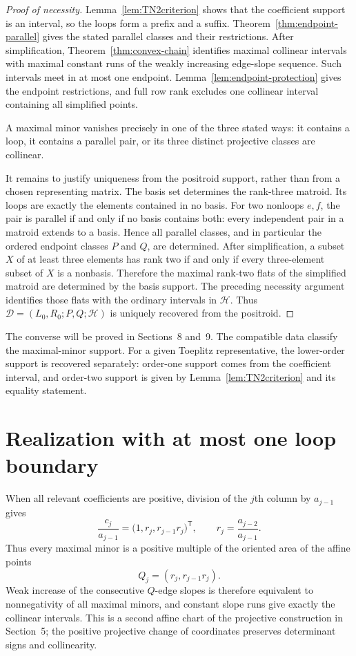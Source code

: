 \documentclass{amsart}
\numberwithin{equation}{section}
\theoremstyle{definition}
\theoremstyle{remark}
\newcommand{\transpose}{\mathsf T}
\begin{document}
\begin{proof}[Proof of necessity]
Lemma~\ref{lem:TN2criterion} shows that the coefficient support is an interval, so the loops form a prefix and a suffix.  Theorem~\ref{thm:endpoint-parallel} gives the stated parallel classes and their restrictions.  After simplification, Theorem~\ref{thm:convex-chain} identifies maximal collinear intervals with maximal constant runs of the weakly increasing edge-slope sequence.  Such intervals meet in at most one endpoint.  Lemma~\ref{lem:endpoint-protection} gives the endpoint restrictions, and full row rank excludes one collinear interval containing all simplified points.

A maximal minor vanishes precisely in one of the three stated ways: it contains a loop, it contains a parallel pair, or its three distinct projective classes are collinear.

It remains to justify uniqueness from the positroid support, rather than from a chosen representing matrix.  The basis set determines the rank-three matroid.  Its loops are exactly the elements contained in no basis.  For two nonloops $e,f$, the pair is parallel if and only if no basis contains both: every independent pair in a matroid extends to a basis.  Hence all parallel classes, and in particular the ordered endpoint classes $P$ and $Q$, are determined.  After simplification, a subset $X$ of at least three elements has rank two if and only if every three-element subset of $X$ is a nonbasis.  Therefore the maximal rank-two flats of the simplified matroid are determined by the basis support.  The preceding necessity argument identifies those flats with the ordinary intervals in $\mathcal H$.  Thus $\mathcal D=(L_0,R_0;P,Q;\mathcal H)$ is uniquely recovered from the positroid.
\end{proof}

The converse will be proved in Sections~8 and~9.  The compatible data classify the maximal-minor support.  For a given Toeplitz representative, the lower-order support is recovered separately: order-one support comes from the coefficient interval, and order-two support is given by Lemma~\ref{lem:TN2criterion} and its equality statement.

\section{Realization with at most one loop boundary}

When all relevant coefficients are positive, division of the $j$th column by $a_{j-1}$ gives
\begin{equation}\label{eq:positive-chart}
 \frac{c_j}{a_{j-1}}
 =\bigl(1,r_j,r_{j-1}r_j\bigr)^{\transpose},
 \qquad
 r_j=\frac{a_{j-2}}{a_{j-1}}.
\end{equation}
Thus every maximal minor is a positive multiple of the oriented area of the affine points
\[
 Q_j=(r_j,r_{j-1}r_j).
\]
Weak increase of the consecutive $Q$-edge slopes is therefore equivalent to nonnegativity of all maximal minors, and constant slope runs give exactly the collinear intervals.  This is a second affine chart of the projective construction in Section~5; the positive projective change of coordinates preserves determinant signs and collinearity.
\end{document}
